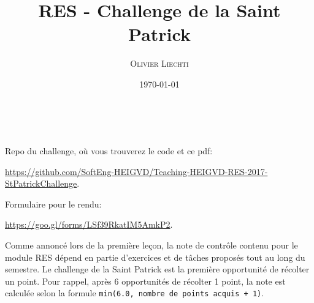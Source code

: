 \documentclass[a4paper, french, 10pt]{article} %
\title{RES - Challenge de la Saint Patrick} %
\author{\textsc{Olivier Liechti}} %
\date{\today} %
\makeatletter
\renewcommand{\maketitle}{ %
\begin{flushright} %
{\LARGE\@title} %

\vspace{5pt} %

{\large\@author} %
\\\@date %

\vspace{-10pt} %
\end{flushright}
}
\makeatother
\begin{document}
\maketitle %





\vspace{30pt} %


\begin{framed}
Repo du challenge, où vous trouverez le code et ce pdf:

\url{https://github.com/SoftEng-HEIGVD/Teaching-HEIGVD-RES-2017-StPatrickChallenge}.

Formulaire pour le rendu:

\url{https://goo.gl/forms/LSf39RkatIM5AmkP2}.
\end{framed}

\begin{framed}
Comme annoncé lors de la première leçon, la note de contrôle contenu pour le module RES dépend en partie d'exercices et de tâches proposés tout au long du semestre. Le challenge de la Saint Patrick est la première opportunité de récolter un point. Pour rappel, après 6 opportunités de récolter 1 point, la note est calculée selon la formule \texttt{min(6.0, nombre de points acquis + 1)}.
\end{framed}
\end{document}
